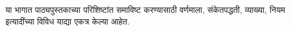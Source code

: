 \documentclass[../../include/open-logic-part]{subfiles}
\begin{document}

\begin{editorial}
  या भागात पाठ्यपुस्तकाच्या परिशिष्टांत समाविष्ट करण्यासाठी वर्णमाला,
  संकेतपद्धती, व्याख्या, नियम इत्यादींच्या विविध याद्या एकत्र केल्या आहेत.
\end{editorial}



\OLEndPartHook
\end{document}
